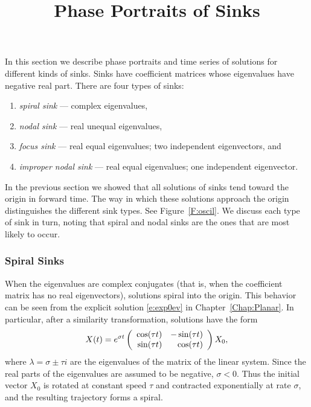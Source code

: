 \documentclass{ximera}
\title{Phase Portraits of Sinks}
\begin{document}
\begin{abstract}
\end{abstract}
\maketitle

  \label{S:PlanarSystems}

In this section we describe phase portraits and time series of
solutions for different kinds of sinks. Sinks have coefficient
matrices whose eigenvalues have negative real part.  There are
four types of sinks:
\begin{enumerate}
\item {\em spiral sink\/} --- complex eigenvalues,
\item {\em nodal sink\/} --- real unequal eigenvalues,
\item {\em focus sink\/} --- real equal eigenvalues; two independent
eigenvectors, and
\item {\em improper nodal sink\/} --- real equal eigenvalues; one independent
eigenvector.
\end{enumerate}
In the previous section we showed that all solutions of sinks tend toward
the origin in forward time.  The way in which these solutions approach the
origin distinguishes the different sink types.  See Figure~\ref{F:oscil}.
We discuss each type of sink in turn, noting that
spiral and nodal sinks are the ones that are most likely to occur.

\subsubsection*{Spiral Sinks}

When the eigenvalues are complex conjugates (that is, when the
coefficient matrix has no real eigenvectors), solutions
spiral into the origin.  This behavior can be seen from the
explicit solution \eqref{e:exp0ev} in Chapter~\ref{Chap:Planar}.
In particular, after a similarity transformation, solutions have the form
\[
X(t)  = e^{\sigma t}\left(\begin{array}{rr} \cos(\tau t) & -\sin(\tau t)\\ \sin(\tau t) &\cos(\tau t)\end{array}\right)X_0,
\]
where $\lambda=\sigma\pm\tau i$ are the eigenvalues of
the matrix of the linear system.  Since the real parts of
the eigenvalues are assumed to be negative, $\sigma<0$.  Thus
the initial vector $X_0$ is rotated at constant speed $\tau$
and contracted exponentially at rate $\sigma$, and the
resulting trajectory forms a spiral.
\end{document}

